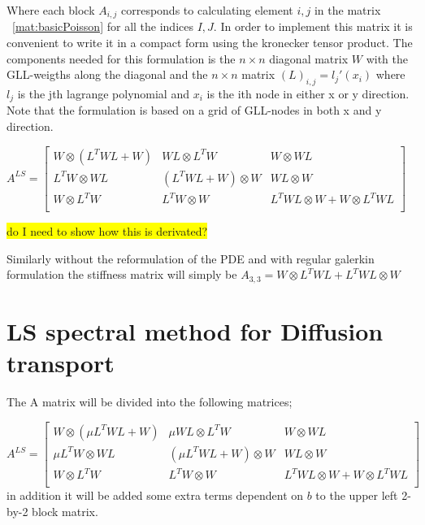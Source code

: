 Where each block $A_{i,j}$ corresponds to  calculating element $i,j$ in the matrix ~\ref{mat:basicPoisson} for all the indices $I,J$. In order to implement this matrix it is convenient to write it in a compact form using the kronecker tensor product. The components needed for this formulation is the $n \times n$ diagonal matrix $ W $ with the GLL-weigths along the diagonal and the $n \times n$ matrix $(L)_{i,j}= l_j'(x_i)$ where $l_j$ is the jth lagrange polynomial and $x_i$ is the ith node in either x or y direction. Note that the formulation is based on a grid of GLL-nodes in both x and y direction. 

$
A^{LS} = 
\begin{bmatrix}
	W \otimes (L^TWL+W) & WL \otimes L^TW 		 &	W \otimes WL  \\ 	
	L^TW \otimes WL     & (L^TWL+W) \otimes W  &	WL \otimes W  \\ 	
	W \otimes L^TW		  & L^TW \otimes W       &  L^TWL \otimes W +	W\otimes L^TWL  \\ 	
\end{bmatrix}
$

\colorbox{yellow}{do I need to show how this is derivated?}

Similarly without the reformulation of the PDE and with regular galerkin formulation the stiffness matrix will simply be 
$A_{3,3} = W \otimes L^TWL+ L^TWL \otimes W$
\section{LS spectral method for Diffusion transport}
The A matrix will be divided into the following matrices;

$
A^{LS} = 
\begin{bmatrix}
	W \otimes (\mu L^TWL+W) & \mu WL \otimes L^TW 		 &	W \otimes WL  \\ 	
	\mu L^TW \otimes WL     & (\mu L^TWL+W) \otimes W  &	WL \otimes W  \\ 	
	W \otimes L^TW		  & L^TW \otimes W       &  L^TWL \otimes W +	W\otimes L^TWL  \\ 	
\end{bmatrix}
$
in addition it will be added some extra terms dependent on $b$ to the upper left 2-by-2 block matrix. 

